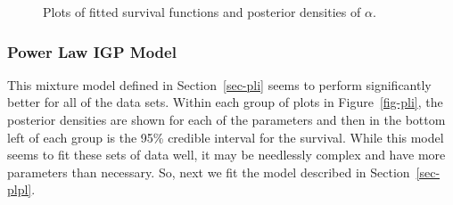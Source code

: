 \documentclass[
]{article}
\begin{document}
\begin{figure}[H]


\caption{\label{fig-pl}Plots of fitted survival functions and posterior
densities of \(\alpha\).}

\end{figure}%

\subsubsection{Power Law IGP Model}\label{power-law-igp-model}

This mixture model defined in Section~\ref{sec-pli} seems to perform
significantly better for all of the data sets. Within each group of
plots in Figure~\ref{fig-pli}, the posterior densities are shown for
each of the parameters and then in the bottom left of each group is the
95\% credible interval for the survival. While this model seems to fit
these sets of data well, it may be needlessly complex and have more
parameters than necessary. So, next we fit the model described in
Section~\ref{sec-plpl}.
\end{document}
